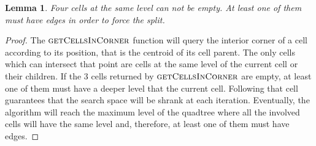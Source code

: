 \documentclass{article}
\newtheorem*{lemma}{Lemma}
\begin{document}
    \begin{lemma}
    Four cells at the same level can not be empty.  At least one of them must have edges in order to force the split.
    \end{lemma}
    
    \begin{proof}
    The $\textsc{getCellsInCorner}$ function will query the interior corner of a cell according to its position, that is the centroid of its cell parent.  The only cells which can intersect that point are cells at the same level of the current cell or their children.  If the 3 cells returned by $\textsc{getCellsInCorner}$ are empty, at least one of them must have a deeper level that the current cell.  Following that cell guarantees that the search space will be shrank at each iteration.  Eventually, the algorithm will reach the maximum level of the quadtree where all the involved cells will have the same level and, therefore, at least one of them must have edges.
    \end{proof}
    
\end{document}
